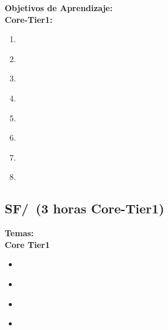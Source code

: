 \noindent \textbf{Objetivos de Aprendizaje:}\\
\noindent \textbf{Core-Tier1:}
\begin{enumerate}
	\setcounter{enumi}{0}
	\item \SFComputationalParadigmsLOListCommonly\xspace[\SFComputationalParadigmsLOListCommonlyLevel]\label{sec:BOK:SFComputationalParadigmsLOListCommonly}
	\item \SFComputationalParadigmsLODescribeTheBlocks\xspace[\SFComputationalParadigmsLODescribeTheBlocksLevel]\label{sec:BOK:SFComputationalParadigmsLODescribeTheBlocks}
	\item \SFComputationalParadigmsLOArticulateTheSingle\xspace[\SFComputationalParadigmsLOArticulateTheSingleLevel]\label{sec:BOK:SFComputationalParadigmsLOArticulateTheSingle}
	\item \SFComputationalParadigmsLOArticulateTheStrong\xspace[\SFComputationalParadigmsLOArticulateTheStrongLevel]\label{sec:BOK:SFComputationalParadigmsLOArticulateTheStrong}
	\item \SFComputationalParadigmsLODesignACircuit\xspace[\SFComputationalParadigmsLODesignACircuitLevel]\label{sec:BOK:SFComputationalParadigmsLODesignACircuit}
	\item \SFComputationalParadigmsLOUseTools\xspace[\SFComputationalParadigmsLOUseToolsLevel]\label{sec:BOK:SFComputationalParadigmsLOUseTools}
	\item \SFComputationalParadigmsLOWriteAProblem\xspace[\SFComputationalParadigmsLOWriteAProblemLevel]\label{sec:BOK:SFComputationalParadigmsLOWriteAProblem}
	\item \SFComputationalParadigmsLOEvaluatePerformance\xspace[\SFComputationalParadigmsLOEvaluatePerformanceLevel]\label{sec:BOK:SFComputationalParadigmsLOEvaluatePerformance}
\end{enumerate}


\subsection{SF/\SFCrossLayerCommunications~(3 horas Core-Tier1)}\label{sec:BOK:SFCrossLayerCommunications}
\noindent \textbf{Temas:}\\
\noindent \textbf{Core Tier1}
\begin{itemize}
	\item \SFCrossLayerCommunicationsTopicProgramming\label{sec:BOK:SFCrossLayerCommunicationsTopicProgramming}
	\item \SFCrossLayerCommunicationsTopicDistinction\label{sec:BOK:SFCrossLayerCommunicationsTopicDistinction}
	\item \SFCrossLayerCommunicationsTopicApplicationVirtual\label{sec:BOK:SFCrossLayerCommunicationsTopicApplicationVirtual}
	\item \SFCrossLayerCommunicationsTopicReliability\label{sec:BOK:SFCrossLayerCommunicationsTopicReliability}
\end{itemize}


